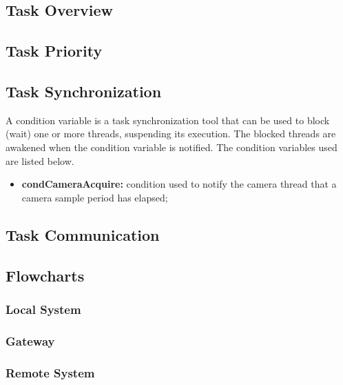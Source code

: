 \subsection{Task Overview}

\subsection{Task Priority}

\subsection{Task Synchronization}

A condition variable is a task synchronization tool that can be used to block (wait) one or more threads, suspending its execution. The blocked threads are awakened when the condition variable is notified. The condition variables used are listed below.

\begin{itemize}
	\item \textbf{condCameraAcquire:} condition used to notify the camera thread that a camera sample period has elapsed;
\end{itemize}



\subsection{Task Communication}

\subsection{Flowcharts}
\subsubsection{Local System}
\subsubsection{Gateway}
\subsubsection{Remote System}

